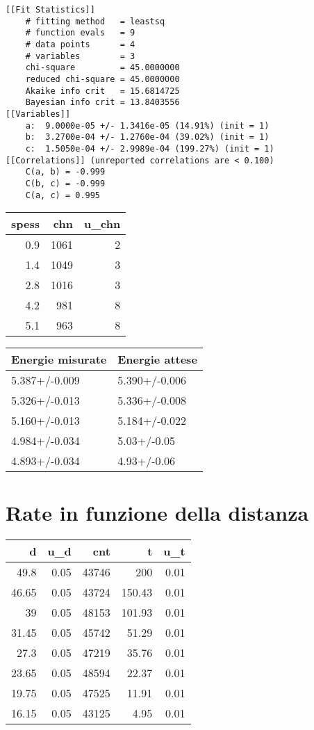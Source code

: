 \begin{verbatim}
[[Fit Statistics]]
    # fitting method   = leastsq
    # function evals   = 9
    # data points      = 4
    # variables        = 3
    chi-square         = 45.0000000
    reduced chi-square = 45.0000000
    Akaike info crit   = 15.6814725
    Bayesian info crit = 13.8403556
[[Variables]]
    a:  9.0000e-05 +/- 1.3416e-05 (14.91%) (init = 1)
    b:  3.2700e-04 +/- 1.2760e-04 (39.02%) (init = 1)
    c:  1.5050e-04 +/- 2.9989e-04 (199.27%) (init = 1)
[[Correlations]] (unreported correlations are < 0.100)
    C(a, b) = -0.999
    C(b, c) = -0.999
    C(a, c) = 0.995 

\end{verbatim}

\begin{longtable}[]{@{}rrr@{}}
\toprule
spess & chn & u\_chn \\
\midrule
\endhead
0.9 & 1061 & 2 \\
1.4 & 1049 & 3 \\
2.8 & 1016 & 3 \\
4.2 & 981 & 8 \\
5.1 & 963 & 8 \\
\bottomrule
\end{longtable}

\begin{longtable}[]{@{}ll@{}}
\toprule
Energie misurate & Energie attese \\
\midrule
\endhead
5.387+/-0.009 & 5.390+/-0.006 \\
5.326+/-0.013 & 5.336+/-0.008 \\
5.160+/-0.013 & 5.184+/-0.022 \\
4.984+/-0.034 & 5.03+/-0.05 \\
4.893+/-0.034 & 4.93+/-0.06 \\
\bottomrule
\end{longtable}

\hypertarget{rate-in-funzione-della-distanza}{%
\section{Rate in funzione della
distanza}\label{rate-in-funzione-della-distanza}}

\begin{longtable}[]{@{}rrrrr@{}}
\toprule
d & u\_d & cnt & t & u\_t \\
\midrule
\endhead
49.8 & 0.05 & 43746 & 200 & 0.01 \\
46.65 & 0.05 & 43724 & 150.43 & 0.01 \\
39 & 0.05 & 48153 & 101.93 & 0.01 \\
31.45 & 0.05 & 45742 & 51.29 & 0.01 \\
27.3 & 0.05 & 47219 & 35.76 & 0.01 \\
23.65 & 0.05 & 48594 & 22.37 & 0.01 \\
19.75 & 0.05 & 47525 & 11.91 & 0.01 \\
16.15 & 0.05 & 43125 & 4.95 & 0.01 \\
\bottomrule
\end{longtable}

